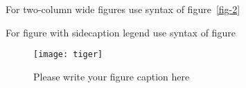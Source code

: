 \documentclass{webofc}
\begin{document}
For two-column wide figures use syntax of figure~\ref{fig-2}
\begin{figure*}
\centering
\vspace*{5cm}       %
\caption{Please write your figure caption here}
\label{fig-2}       %
\end{figure*}

For figure with sidecaption legend use syntax of figure
\begin{figure}
\centering
\sidecaption
\texttt{[image: tiger]}
\caption{Please write your figure caption here}
\label{fig-3}       %
\end{figure}
\end{document}
